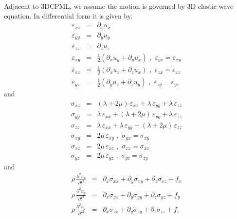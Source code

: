 \documentclass[onecolumn,extra]{gji_modified_cours_UPPA}
\begin{document}
\noindent
Adjacent to 3DCPML, we assume the motion is governed by 3D elastic wave equation. In differential form it is given by:
%
\begin{eqnarray}
\varepsilon_{xx} & = & \partial_x u_x \nonumber \\
\varepsilon_{yy} & = & \partial_y u_y \nonumber \\
\varepsilon_{zz} & = & \partial_z u_z \nonumber \\
\varepsilon_{xy} & = & \frac{1}{2} (\partial_x u_y + \partial_y u_x) \,\, , \,\, \varepsilon_{yx} =  \varepsilon_{xy} \nonumber \\
\varepsilon_{xz} & = & \frac{1}{2} (\partial_x u_z + \partial_z u_x) \,\, , \,\, \varepsilon_{zx} =  \varepsilon_{xz} \nonumber \\
\varepsilon_{yz} & = & \frac{1}{2} (\partial_y u_z + \partial_z u_y) \,\, , \,\, \varepsilon_{zy} =  \varepsilon_{yz}
\end{eqnarray}
%
\noindent and
%
\begin{eqnarray}
\sigma_{xx} & = & (\lambda + 2 \mu) \, \varepsilon_{xx} + \lambda \, \varepsilon_{yy} + \lambda \, \varepsilon_{zz} \nonumber \\
\sigma_{yy} & = & \lambda \, \varepsilon_{xx} + (\lambda + 2 \mu) \, \varepsilon_{yy} + \lambda \, \varepsilon_{zz} \nonumber \\
\sigma_{zz} & = & \lambda \, \varepsilon_{xx} + \lambda \, \varepsilon_{yy} + (\lambda + 2 \mu) \, \varepsilon_{zz} \nonumber \\
\sigma_{xy} & = & 2 \mu \, \varepsilon_{xy} \,\, , \,\, \sigma_{yx} =  \sigma_{xy} \nonumber \\
\sigma_{xz} & = & 2 \mu \, \varepsilon_{xz} \,\, , \,\, \sigma_{zx} =  \sigma_{xz} \nonumber \\
\sigma_{yz} & = & 2 \mu \, \varepsilon_{yz} \,\, , \,\, \sigma_{yz} =  \sigma_{zy}
\end{eqnarray}
%
\noindent and
%
\begin{eqnarray}
\rho \, \frac{\partial^2 u_x}{\partial t^2} & = & \partial_x \sigma_{xx} + \partial_y \sigma_{xy} + \partial_z \sigma_{xz} + f_x \nonumber \\
\rho \, \frac{\partial^2 u_y}{\partial t^2} & = & \partial_x \sigma_{yx} + \partial_y \sigma_{yy} + \partial_z \sigma_{yz} + f_y \nonumber \\
\rho \, \frac{\partial^2 u_z}{\partial t^2} & = & \partial_x \sigma_{zx} + \partial_y \sigma_{zy} + \partial_z \sigma_{zz} + f_z
\end{eqnarray}
\end{document}
